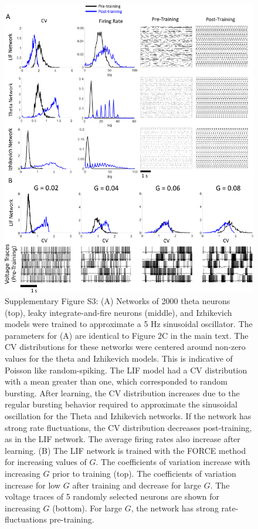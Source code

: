 \documentclass[11pt]{article} %
\begin{document}
\newpage 
\begin{figure}[htp!]
\centering
\includegraphics[scale=0.9]{FFIGS5}
\caption*{Supplementary Figure S3:  (A) Networks of 2000 theta neurons (top), leaky integrate-and-fire neurons (middle), and Izhikevich models were trained to approximate a 5 Hz sinusoidal oscillator.  The parameters for (A) are identical to Figure 2C in the main text.  The CV distributions for these networks were centered around non-zero values for the theta and Izhikevich models.  This is indicative of Poisson like random-spiking.  The LIF model had a CV distribution with a mean greater than one, which corresponded to random bursting.  After learning, the CV distribution increases due to the regular bursting behavior required to approximate the sinusoidal oscillation for the Theta and Izhikevich networks.  If the network has strong rate fluctuations, the CV distribution decreases post-training, as in the LIF network.     The average firing rates also increase after learning. (B)  The LIF network is trained with the FORCE method for increasing values of $G$. The coefficients of variation increase with increasing $G$ prior to training (top).  The coefficients of variation increase for low $G$ after training and decrease for large $G$.  The voltage traces of 5 randomly selected neurons are shown for increasing $G$ (bottom).   For large $G$, the network has strong rate-fluctuations pre-training.    }
\end{figure}
\end{document}
